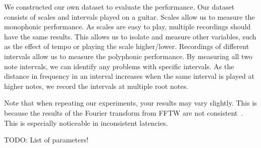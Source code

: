 \documentclass[10pt,twocolumn]{article}
\begin{document}
We constructed our own dataset to evaluate the performance. Our dataset consists of scales and intervals played on a guitar. Scales allow us to measure the monophonic performance. As scales are easy to play, multiple recordings should have the same results. This allows us to isolate and measure other variables, such as the effect of tempo or playing the scale higher/lower. Recordings of different intervals allow us to measure the polyphonic performance. By measuring all two note intervals, we can identify any problems with specific intervals. As the distance in frequency in an interval increases when the same interval is played at higher notes, we record the intervals at multiple root notes.%

Note that when repeating our experiments, your results may vary slightly. This is because the results of the Fourier transform from FFTW are not consistent~\cite{fftw}. This is especially noticeable in inconsistent latencies.

TODO: List of parameters!
\end{document}
